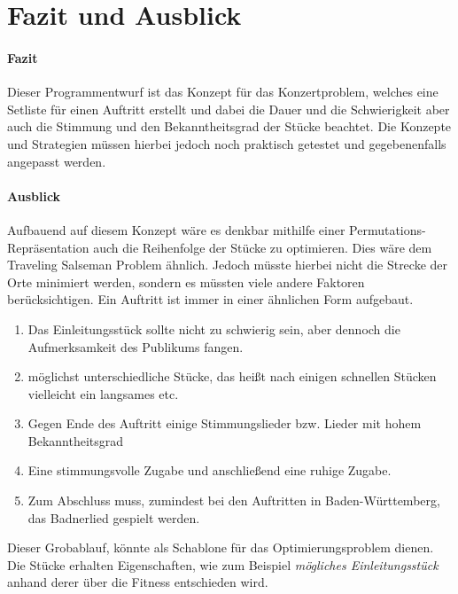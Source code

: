 \section{Fazit und Ausblick}\label{sec:fazit}
\paragraph{Fazit}
Dieser Programmentwurf ist das Konzept für das Konzertproblem, welches 
eine Setliste für einen Auftritt erstellt und dabei die Dauer und die Schwierigkeit 
aber auch die Stimmung und den Bekanntheitsgrad der Stücke beachtet. 
Die Konzepte und Strategien müssen hierbei jedoch noch praktisch getestet und 
gegebenenfalls angepasst werden. \\
\paragraph{Ausblick}
Aufbauend auf diesem Konzept wäre es denkbar mithilfe einer Permutations-Repräsentation 
auch die Reihenfolge der Stücke zu optimieren. Dies wäre dem Traveling Salseman Problem
ähnlich. Jedoch müsste hierbei nicht die Strecke der Orte minimiert werden, sondern es müssten 
viele andere Faktoren berücksichtigen. Ein Auftritt ist immer in einer ähnlichen Form 
aufgebaut.
\begin{enumerate}
    \item Das Einleitungsstück sollte nicht zu schwierig sein, aber dennoch die Aufmerksamkeit 
        des Publikums fangen.
    \item möglichst unterschiedliche Stücke, das heißt nach einigen schnellen Stücken vielleicht ein 
        langsames etc. 
    \item Gegen Ende des Auftritt einige Stimmungslieder bzw. Lieder mit hohem Bekanntheitsgrad
    \item Eine stimmungsvolle Zugabe und anschließend eine ruhige Zugabe. 
    \item Zum Abschluss muss, zumindest bei den Auftritten in Baden-Württemberg, das Badnerlied gespielt werden. 
\end{enumerate}

Dieser Grobablauf, könnte als Schablone für das Optimierungsproblem dienen. Die Stücke erhalten Eigenschaften, 
wie zum Beispiel \textit{mögliches Einleitungsstück} anhand derer über die Fitness entschieden wird. 

